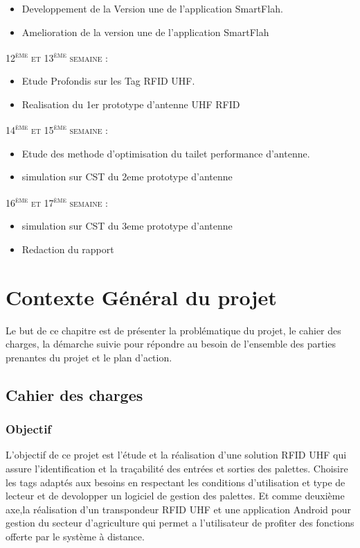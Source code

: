 \documentclass[11pt, a4paper, twoside]{book}
\begin{document}
\begin{itemize}
\item Developpement de la Version une de l'application SmartFlah.
\item Amelioration de la version une de l'application SmartFlah
\end{itemize}
\textsc{12\textsuperscript{ème} et 13\textsuperscript{ème} semaine :}
\begin{itemize}
\item Etude Profondis sur les Tag RFID UHF.
\item Realisation du 1er prototype d'antenne UHF RFID
\end{itemize}
\textsc{14\textsuperscript{ème} et 15\textsuperscript{ème} semaine :}
\begin{itemize}
\item Etude des methode d'optimisation du tailet performance d'antenne.
\item simulation sur CST du 2eme prototype d'antenne
\end{itemize}
\textsc{16\textsuperscript{ème} et 17\textsuperscript{ème} semaine :}
\begin{itemize}
\item simulation sur CST du 3eme prototype d'antenne
\item Redaction du rapport
\end{itemize}



\chapter{Contexte Général du projet}
Le but de ce chapitre est de présenter la problématique du projet, le cahier des charges, la démarche suivie pour répondre au besoin de l’ensemble des parties prenantes du projet et le plan d’action.
\section{Cahier des charges}
\subsection{Objectif}
L’objectif de ce projet est l'étude et la réalisation d’une solution RFID UHF qui assure l’identification et la traçabilité des entrées et sorties des palettes. Choisire les tags adaptés aux besoins en respectant les conditions d’utilisation et type de lecteur et de devolopper un logiciel de gestion des palettes. 
Et comme deuxième axe,la réalisation d’un transpondeur RFID UHF et une application Android pour gestion du secteur d'agriculture qui permet a
l’utilisateur de profiter des fonctions offerte par le système à distance. \\
\end{document}
